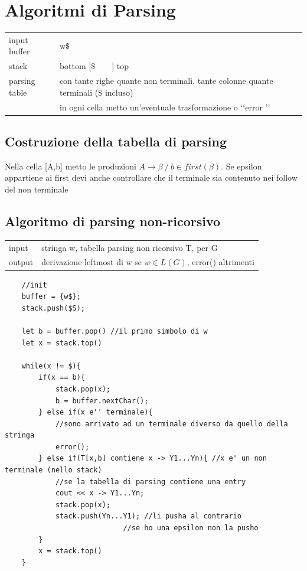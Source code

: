 \section{Algoritmi di Parsing}
\begin{center}
    \begin{tabular}{ll}
        input buffer    &   w$\$$   \\
        stack           &   bottom [$ \$ \qquad $] top \\
        parsing table   &   con tante righe quante non terminali, tante colonne quante terminali ($ \$ $ incluso)\\
                        &   in ogni cella metto un'eventuale trasformazione o \lq\lq error \rq\rq \\
    \end{tabular}
\end{center}
\subsection{Costruzione della tabella di parsing}
    Nella cella [A,b] metto le produzioni $A \rightarrow \beta \ / \ b \in first(\beta)$.
    Se epsilon appartiene ai first devi anche controllare che il terminale sia contenuto nei follow del non terminale

\subsection{Algoritmo di parsing non-ricorsivo}
\begin{center}
    \begin{tabular}{ll}
        input   &   stringa w, tabella parsing non ricorsivo T, per G\\
        output  &   derivazione leftmost di w se $w \in L(G)$, error() altrimenti\\
    \end{tabular}
\end{center}

\begin{lstlisting}
    //init
    buffer = {w$};
    stack.push($S);

    let b = buffer.pop() //il primo simbolo di w 
    let x = stack.top()  

    while(x != $){
        if(x == b){
            stack.pop(x);
            b = buffer.nextChar();
        } else if(x e'' terminale){ 
            //sono arrivato ad un terminale diverso da quello della stringa
            error();
        } else if(T[x,b] contiene x -> Y1...Yn){ //x e' un non terminale (nello stack)
            //se la tabella di parsing contiene una entry 
            cout << x -> Y1...Yn;
            stack.pop(x);
            stack.push(Yn...Y1); //li pusha al contrario
                            //se ho una epsilon non la pusho
        }
        x = stack.top()
    }
\end{lstlisting}

